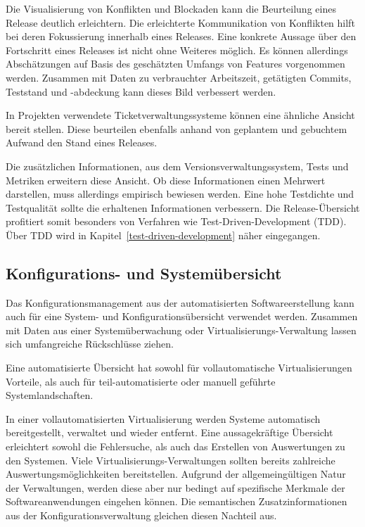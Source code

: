 Die Visualisierung von Konflikten und Blockaden kann die Beurteilung eines Release deutlich erleichtern. Die erleichterte Kommunikation von Konflikten hilft bei deren Fokussierung innerhalb eines Releases. Eine konkrete Aussage über den Fortschritt eines Releases ist nicht ohne Weiteres möglich. Es können allerdings Abschätzungen auf Basis des geschätzten Umfangs von Features vorgenommen werden. Zusammen mit Daten zu verbrauchter Arbeitszeit, getätigten Commits, Teststand und -abdeckung kann dieses Bild verbessert werden.

In Projekten verwendete Ticketverwaltungssysteme können eine ähnliche Ansicht bereit stellen. Diese beurteilen ebenfalls anhand von geplantem und gebuchtem Aufwand den Stand eines Releases.

Die zusätzlichen Informationen, aus dem Versionsverwaltungssystem, Tests und Metriken erweitern diese Ansicht. Ob diese Informationen einen Mehrwert darstellen, muss allerdings empirisch bewiesen werden.
Eine hohe Testdichte und Testqualität sollte die erhaltenen Informationen verbessern. Die Release-Übersicht profitiert somit besonders von Verfahren wie Test-Driven-Development (TDD). Über TDD wird in Kapitel~\ref{test-driven-development} näher eingegangen.

\subsection{Konfigurations- und Systemübersicht}
\label{subsubsec:configuration-system-overview}

Das Konfigurationsmanagement aus der automatisierten Softwareerstellung kann auch für eine System- und Konfigurationsübersicht verwendet werden. Zusammen mit Daten aus einer Systemüberwachung oder Virtualisierungs-Verwaltung lassen sich umfangreiche Rückschlüsse ziehen. 

Eine automatisierte Übersicht hat sowohl für vollautomatische Virtualisierungen Vorteile, als auch für teil-automatisierte oder manuell geführte Systemlandschaften.

In einer vollautomatisierten Virtualisierung werden Systeme automatisch bereitgestellt, verwaltet und wieder entfernt. Eine aussagekräftige Übersicht erleichtert sowohl die Fehlersuche, als auch das Erstellen von Auswertungen zu den Systemen. Viele Virtualisierungs-Verwaltungen sollten bereits zahlreiche Auswertungsmöglichkeiten bereitstellen. Aufgrund der allgemeingültigen Natur der Verwaltungen, werden diese aber nur bedingt auf spezifische Merkmale der Softwareanwendungen eingehen können. Die semantischen Zusatzinformationen aus der Konfigurationsverwaltung gleichen diesen Nachteil aus.

